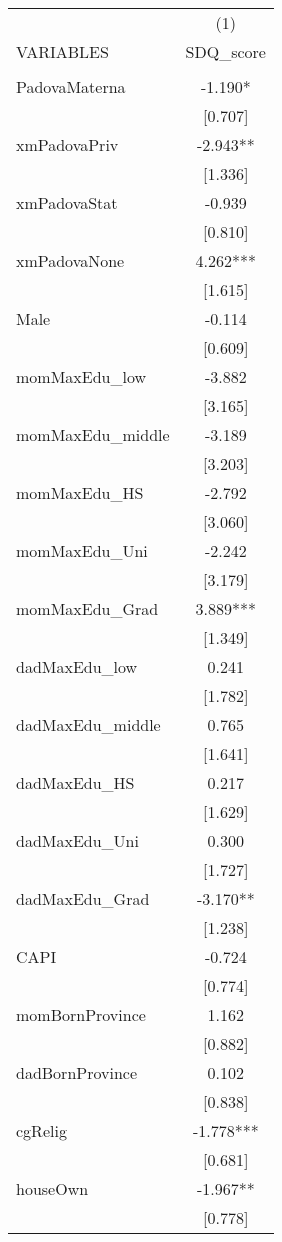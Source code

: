 \documentclass[]{article}
\begin{document}
\begin{tabular}{lc} \hline
 & (1) \\
VARIABLES & SDQ\_score \\ \hline
 &  \\
PadovaMaterna & -1.190* \\
 & [0.707] \\
xmPadovaPriv & -2.943** \\
 & [1.336] \\
xmPadovaStat & -0.939 \\
 & [0.810] \\
xmPadovaNone & 4.262*** \\
 & [1.615] \\
Male & -0.114 \\
 & [0.609] \\
momMaxEdu\_low & -3.882 \\
 & [3.165] \\
momMaxEdu\_middle & -3.189 \\
 & [3.203] \\
momMaxEdu\_HS & -2.792 \\
 & [3.060] \\
momMaxEdu\_Uni & -2.242 \\
 & [3.179] \\
momMaxEdu\_Grad & 3.889*** \\
 & [1.349] \\
dadMaxEdu\_low & 0.241 \\
 & [1.782] \\
dadMaxEdu\_middle & 0.765 \\
 & [1.641] \\
dadMaxEdu\_HS & 0.217 \\
 & [1.629] \\
dadMaxEdu\_Uni & 0.300 \\
 & [1.727] \\
dadMaxEdu\_Grad & -3.170** \\
 & [1.238] \\
CAPI & -0.724 \\
 & [0.774] \\
momBornProvince & 1.162 \\
 & [0.882] \\
dadBornProvince & 0.102 \\
 & [0.838] \\
cgRelig & -1.778*** \\
 & [0.681] \\
houseOwn & -1.967** \\
 & [0.778] \\

\end{tabular}
\end{document}
